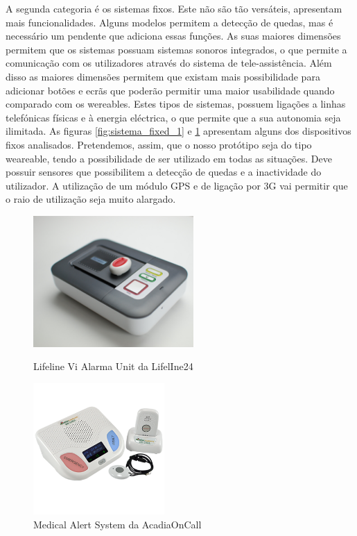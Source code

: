 A segunda categoria é os sistemas fixos. Este não são tão versáteis, apresentam mais funcionalidades. Alguns modelos permitem a detecção de quedas, mas é necessário um pendente que adiciona essas funções. As suas maiores dimensões permitem que os sistemas possuam sistemas sonoros integrados, o que permite a comunicação com os utilizadores através do sistema de tele-assistência. Além disso as maiores dimensões permitem que existam mais possibilidade para adicionar botões e ecrãs que poderão permitir uma maior usabilidade quando comparado com os wereables. Estes tipos de sistemas, possuem ligações a linhas telefónicas físicas e à energia eléctrica, o que permite que a sua autonomia seja ilimitada.
As figuras \ref{fig:sistema_fixed_1} e \ref{fig:sistema_fixed_2} apresentam alguns dos dispositivos fixos analisados.
Pretendemos, assim, que o nosso protótipo seja do tipo weareable, tendo a possibilidade de ser utilizado em todas as situações. Deve possuir sensores que possibilitem a detecção de quedas e a inactividade do utilizador. A utilização de um módulo GPS e de ligação por 3G vai permitir que o raio de utilização seja muito alargado.
\vspace*{-9cm}
\begin{figure}[!htb]
	\centering
	\begin{minipage}[b]{0.45\textwidth}\centering
		\includegraphics[height=5cm]{figuras/Sistemas_Lifeline.png}
		\caption{Lifeline Vi Alarma Unit da LifelIne24}
		\label{fig:sistema_fixed_1}
	\end{minipage}
	\hfill
	\begin{minipage}[b]{0.45\textwidth}\centering
		\includegraphics[height=5cm]{figuras/sistemas_Medical_Alert_System.png}
		\caption{Medical Alert System da AcadiaOnCall}
		\label{fig:sistema_fixed_2}
	\end{minipage}
\end{figure}
\pagebreak